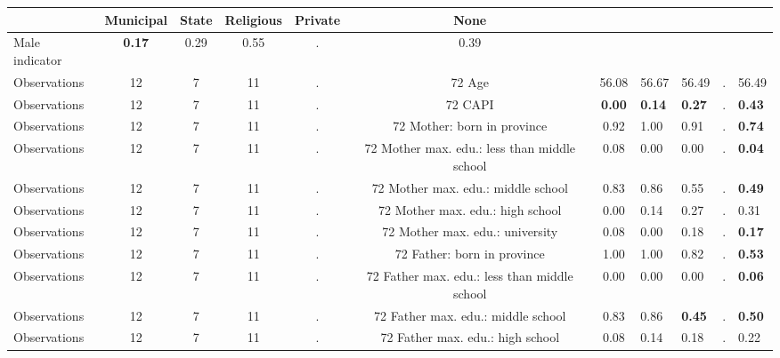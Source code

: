 \begin{tabular}{l c c c c c c }
\toprule
& \textbf{Municipal} & \textbf{State} & \textbf{Religious} & \textbf{Private} & \textbf{None} \\
\midrule
Male indicator & \textbf{     0.17} &      0.29 &      0.55 &         . &      0.39 \\
\midrule
Observations &        12 &         7 &        11 & . &        72
Age &     56.08 &     56.67 &     56.49 &         . &     56.49 \\
\midrule
Observations &        12 &         7 &        11 & . &        72
CAPI & \textbf{     0.00} & \textbf{     0.14} & \textbf{     0.27} &         . & \textbf{     0.43} \\
\midrule
Observations &        12 &         7 &        11 & . &        72
Mother: born in province &      0.92 &      1.00 &      0.91 &         . & \textbf{     0.74} \\
\midrule
Observations &        12 &         7 &        11 & . &        72
Mother max. edu.: less than middle school &      0.08 &      0.00 &      0.00 &         . & \textbf{     0.04} \\
\midrule
Observations &        12 &         7 &        11 & . &        72
Mother max. edu.: middle school &      0.83 &      0.86 &      0.55 &         . & \textbf{     0.49} \\
\midrule
Observations &        12 &         7 &        11 & . &        72
Mother max. edu.: high school &      0.00 &      0.14 &      0.27 &         . &      0.31 \\
\midrule
Observations &        12 &         7 &        11 & . &        72
Mother max. edu.: university &      0.08 &      0.00 &      0.18 &         . & \textbf{     0.17} \\
\midrule
Observations &        12 &         7 &        11 & . &        72
Father: born in province &      1.00 &      1.00 &      0.82 &         . & \textbf{     0.53} \\
\midrule
Observations &        12 &         7 &        11 & . &        72
Father max. edu.: less than middle school &      0.00 &      0.00 &      0.00 &         . & \textbf{     0.06} \\
\midrule
Observations &        12 &         7 &        11 & . &        72
Father max. edu.: middle school &      0.83 &      0.86 & \textbf{     0.45} &         . & \textbf{     0.50} \\
\midrule
Observations &        12 &         7 &        11 & . &        72
Father max. edu.: high school &      0.08 &      0.14 &      0.18 &         . &      0.22 \\

\end{tabular}
